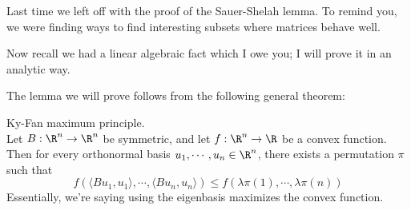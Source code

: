 

Last time we left off with the proof of the Sauer-Shelah lemma. To remind you, we were finding ways to find interesting subsets where matrices behave well. 

Now recall we had a linear algebraic fact which I owe you; I will prove it in an analytic way.

The lemma we will prove follows from the following general theorem: 
\begin{thm} Ky-Fan maximum principle. \\
Let $B: \R^n \to \R^n$ be symmetric, and let $f: \R^n \to \R$ be a convex function. Then for every orthonormal basis $u_1, \cdots, u_n \in \R^n$, there exists a permutation $\pi$ such that 
\[
f(\langle Bu_1, u_1 \rangle, \cdots, \langle Bu_n, u_n \rangle) \leq f(\lambda\pi(1), \cdots, \lambda\pi(n))
\]
Essentially, we're saying using the eigenbasis maximizes the convex function. 
\end{thm}

